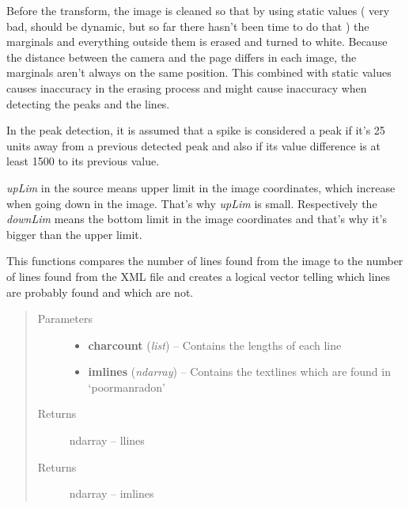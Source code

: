 \documentclass[letterpaper,10pt,english]{sphinxmanual}
\begin{document}
\begin{fulllineitems}
\begin{fulllineitems}
Before the transform, the image is cleaned so that by using static values ( very bad, 
should be dynamic, but so far there hasn't been time to do that ) the marginals and 
everything outside them is erased and turned to white. Because the distance between 
the camera and the page differs in each image, the marginals aren't always on the 
same position. This combined with static values causes inaccuracy in the erasing 
process and might cause inaccuracy when detecting the peaks and the lines.

In the peak detection, it is assumed that a spike is considered a peak if it's 25 units 
away from a previous detected peak and also if its value difference is at least 1500 
to its previous value.

\emph{upLim} in the source means upper limit in the image coordinates, which increase when 
going down in the image. That's why \emph{upLim} is small. Respectively the 
\emph{downLim} means the bottom limit in the image coordinates and that's why it's bigger 
than the upper limit.

\end{fulllineitems}


\begin{fulllineitems}
\label{code:OratUtils.OratUtils.processlines}
This functions compares the number of lines found from the image to the 
number of lines found from the XML file and creates a logical vector 
telling which lines are probably found and which are not.
\begin{quote}\begin{description}
\item[{Parameters}] \leavevmode\begin{itemize}
\item {} 
\textbf{charcount} (\emph{list}) -- Contains the lengths of each line

\item {} 
\textbf{imlines} (\emph{ndarray}) -- Contains the textlines which are found in `poormanradon'

\end{itemize}

\item[{Returns}] \leavevmode
ndarray -- llines

\item[{Returns}] \leavevmode
ndarray -- imlines


\end{description}
\end{quote}
\end{fulllineitems}
\end{fulllineitems}
\end{document}
